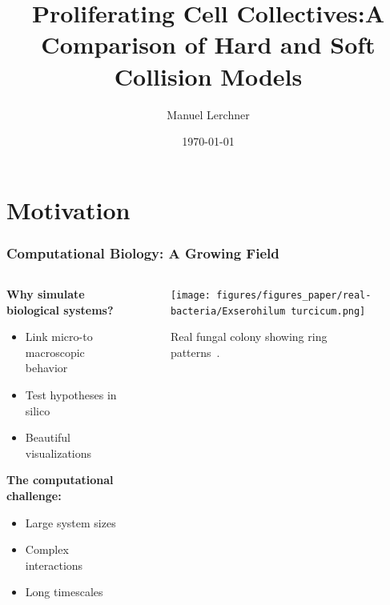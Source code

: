 \documentclass[10pt,t]{beamer}
\title{Proliferating Cell Collectives:\newline A Comparison of Hard and Soft Collision Models}
\author{Manuel Lerchner}
\date{\today}
\begin{document}
\maketitle

\setcounter{framenumber}{0}


\section{Motivation}

\begin{frame}
    \frametitle{Computational Biology: A Growing Field}

    \begin{columns}
        \begin{column}{0.58\textwidth}
            \textbf{Why simulate biological systems?}
            \begin{itemize}
                \item Link micro-to macroscopic behavior
                \item Test hypotheses in silico
                \item Beautiful visualizations
            \end{itemize}

            \vspace{0.5cm}

            \textbf{The computational challenge:}
            \begin{itemize}
                \item Large system sizes
                \item Complex interactions
                \item Long timescales
            \end{itemize}
        \end{column}

        \begin{column}{0.5\textwidth}
            \centering
            \begin{figure}
                \centering
                \texttt{[image: figures/figures\_paper/real-bacteria/Exserohilum turcicum.png]}
                \caption*{\scriptsize{Real fungal colony showing ring patterns~\cite{Bankole2023}.}}
            \end{figure}
        \end{column}
    \end{columns}

\end{frame}
\end{document}

